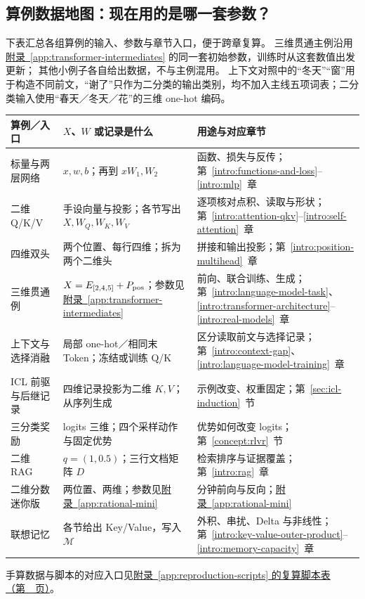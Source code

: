 \subsection{算例数据地图：现在用的是哪一套参数？}
\label{app:data-map}
下表汇总各组算例的输入、参数与章节入口，便于跨章复算。
三维贯通主例沿用\hyperref[app:transformer-intermediates]{附录~\ref*{app:transformer-intermediates}} 的同一套初始参数，训练时从这套数值出发更新；
其他小例子各自给出数据，不与主例混用。
上下文对照中的“冬天”“窗”用于构造不同前文，“谢了”只作为二分类的输出类别，均不加入主线五项词表；二分类输入使用“春天／冬天／花”的三维 one-hot 编码。

\begin{center}\small
\renewcommand{\arraystretch}{1.3}
\begin{tabularx}{\linewidth}{@{}>{\raggedright\arraybackslash}p{34mm}>{\raggedright\arraybackslash}p{45mm}>{\raggedright\arraybackslash}X@{}}
\toprule
算例／入口 & $X$、$W$ 或记录是什么 & 用途与对应章节\\\midrule
标量与两层网络 & $x,w,b$；再到 $xW_1,W_2$ & 函数、损失与反传；第~\ref*{intro:functions-and-loss}--\ref*{intro:mlp}~章\\
二维 Q/K/V & 手设向量与投影；各节写出 $X,W_Q,W_K,W_V$ & 逐项核对点积、读取与形状；第~\ref*{intro:attention-qkv}--\ref*{intro:self-attention}~章\\
四维双头 & 两个位置、每行四维；拆为两个二维头 & 拼接和输出投影；第~\ref*{intro:position-multihead}~章\\
三维贯通例 & $X=E_{[2,4,5]}+P_{\rm pos}$；参数见\hyperref[app:transformer-intermediates]{附录~\ref*{app:transformer-intermediates}} & 前向、联合训练、生成；第~\ref*{intro:language-model-task}、\ref*{intro:transformer-architecture}--\ref*{intro:real-models}~章\\
上下文与选择消融 & 局部 one-hot／相同末 Token；冻结或训练 Q/K & 区分读取前文与选择记录；第~\ref*{intro:context-gap}、\ref*{intro:language-model-training}~章\\
ICL 前驱与后继记录 & 四维记录投影为二维 $K,V$；从序列生成 & 示例改变、权重固定；第~\ref*{sec:icl-induction}~节\\
三分类奖励 & logits 三维；四个采样动作与固定优势 & 优势如何改变 logits；第~\ref*{concept:rlvr}~节\\
二维 RAG & $q=(1,0.5)$；三行文档矩阵 $D$ & 检索排序与证据覆盖；第~\ref*{intro:rag}~章\\
二维分数迷你版 & 两位置、两维；参数见\hyperref[app:rational-mini]{附录~\ref*{app:rational-mini}} & 20 分钟前向与反向；\hyperref[app:rational-mini]{附录~\ref*{app:rational-mini}}\\
联想记忆 & 各节给出 Key/Value，写入 $\mathcal M$ & 外积、串扰、Delta 与非线性；第~\ref*{intro:key-value-outer-product}--\ref*{intro:memory-capacity}~章\\
\bottomrule
\end{tabularx}
\end{center}
手算数据与脚本的对应入口见\hyperref[app:reproduction-scripts]{附录~\ref*{app:reproduction-scripts} 的复算脚本表（第~\pageref*{app:reproduction-scripts}~页）}。
